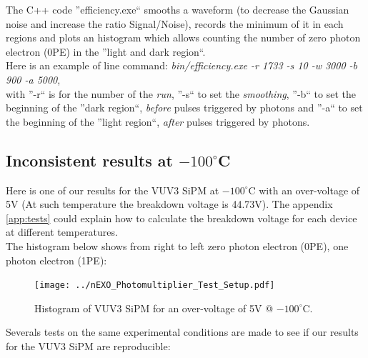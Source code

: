 \documentclass[a4paper, 11pt]{report}%
\begin{document}
  The C++ code ''efficiency.exe`` smooths a waveform (to decrease the Gaussian noise and increase the ratio Signal/Noise),
  records the minimum of it in each regions and plots an histogram which allows counting the number of 
  zero photon electron (0PE) in the ''light and dark region``.
  \\
  
  Here is an example of line command: \textit{bin/efficiency.exe -r 1733 -s 10 -w 3000 -b 900 -a 5000},\\
  with ''-r`` is for the number 
  of the \textit{run}, ''-s`` to set the \textit{smoothing}, ''-b`` to set the beginning of the ''dark region``, \textit{before} 
  pulses triggered by photons and ''-a`` to set the beginning of the ''light region``, \textit{after} pulses triggered by photons.
  
  
  
  \subsection{Inconsistent results at $-100^\circ$C}
  
  Here is one of our results for the VUV3 SiPM at $-100^\circ$C with an over-voltage of 5V (At such temperature the breakdown voltage 
  is 44.73V). The appendix \ref{app:tests} could explain how to calculate the breakdown voltage for each device at different temperatures. 
  \\
  
  The histogram below shows from right to left zero photon electron (0PE), one photon electron (1PE):   
  
  \newpage

  \begin{figure}[!hbtp]
    \centering
    \texttt{[image: ../nEXO\_Photomultiplier\_Test\_Setup.pdf]} 
    \caption{Histogram of VUV3 SiPM for an over-voltage of 5V @ $-100^\circ$C.}
    \label{fig:histo_PE}
  \end{figure}

  
  Severals tests on the same experimental conditions are made to see if our results for the VUV3 SiPM are reproducible:
  
\end{document}
